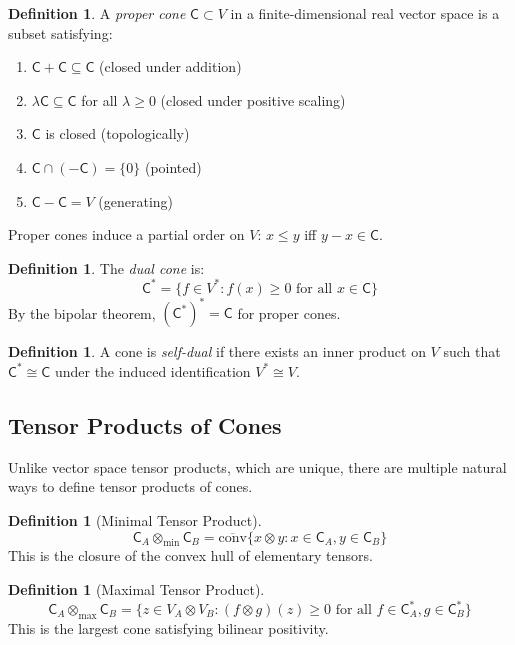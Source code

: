 \documentclass[11pt,a4paper]{article}
\theoremstyle{definition}
\newtheorem{definition}[theorem]{Definition}
\newcommand{\C}{\mathsf{C}}
\newcommand{\Cstar}{\mathsf{C}^*}
\newcommand{\tmin}{\otimes_{\min}}
\newcommand{\tmax}{\otimes_{\max}}
\newcommand{\conv}{\mathrm{conv}}
\begin{document}
\begin{definition}
A \emph{proper cone} $\C \subset V$ in a finite-dimensional real vector space is a subset satisfying:
\begin{enumerate}[label=(\roman*)]
    \item $\C + \C \subseteq \C$ (closed under addition)
    \item $\lambda \C \subseteq \C$ for all $\lambda \geq 0$ (closed under positive scaling)
    \item $\C$ is closed (topologically)
    \item $\C \cap (-\C) = \{0\}$ (pointed)
    \item $\C - \C = V$ (generating)
\end{enumerate}
\end{definition}

Proper cones induce a partial order on $V$: $x \leq y$ iff $y - x \in \C$.

\begin{definition}
The \emph{dual cone} is:
\[
\Cstar = \{f \in V^* : f(x) \geq 0 \text{ for all } x \in \C\}
\]
By the bipolar theorem, $(\Cstar)^* = \C$ for proper cones.
\end{definition}

\begin{definition}
A cone is \emph{self-dual} if there exists an inner product on $V$ such that $\Cstar \cong \C$ under the induced identification $V^* \cong V$.
\end{definition}

\subsection{Tensor Products of Cones}

Unlike vector space tensor products, which are unique, there are multiple natural ways to define tensor products of cones.

\begin{definition}[Minimal Tensor Product]
\[
\C_A \tmin \C_B = \overline{\conv}\{x \otimes y : x \in \C_A, y \in \C_B\}
\]
This is the closure of the convex hull of elementary tensors.
\end{definition}

\begin{definition}[Maximal Tensor Product]
\[
\C_A \tmax \C_B = \{z \in V_A \otimes V_B : (f \otimes g)(z) \geq 0 \text{ for all } f \in \C_A^*, g \in \C_B^*\}
\]
This is the largest cone satisfying bilinear positivity.
\end{definition}
\end{document}
